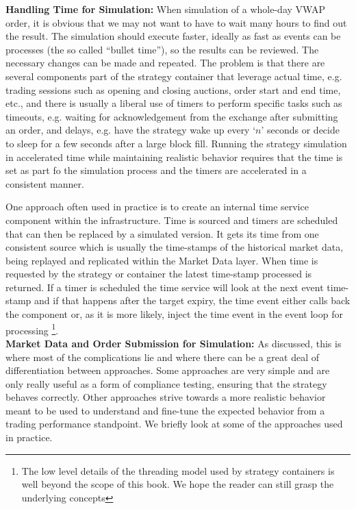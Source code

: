 \noindent\textbf{Handling Time for Simulation:} When simulation of a whole-day VWAP order, it is obvious that we may not want to have to wait many hours to find out the result. The simulation should execute faster, ideally as fast as events can be processes (the so called ``bullet time''), so the results can be reviewed. The necessary changes can be made and repeated. The problem is that there are several components part of the strategy container that leverage actual time, e.g. trading sessions such as opening and closing auctions, order start and end time, etc., and there is usually a liberal use of timers to perform specific tasks such as timeouts, e.g. waiting for acknowledgement from the exchange after submitting an order, and delays, e.g. have the strategy wake up every `$n$' seconds or decide to sleep for a few seconds after a large block fill. Running the strategy simulation in accelerated time while maintaining realistic behavior requires that the time is set as part fo the simulation process and the timers are accelerated in a consistent manner.


One approach often used in practice is to create an internal time service component within the infrastructure. Time is sourced and timers are scheduled that can then be replaced by a simulated version. It gets its time from one consistent source which is usually the time-stamps of the historical market data, being replayed and replicated within the Market Data layer. When time is requested by the strategy or container the latest time-stamp processed is returned. If a timer is scheduled the time service will look at the next event time-stamp and if that happens after the target expiry, the time event either calls back the component or, as it is more likely, inject the time event in the event loop for processing \footnote{The low level details of the threading model used by strategy containers is well beyond the scope of this book. We hope the reader can still grasp the underlying concepts}. \\


\noindent\textbf{Market Data and Order Submission for Simulation:} As discussed, this is where most of the complications lie and where there can be a great deal of differentiation between approaches. Some approaches are very simple and are only really useful as a form of compliance testing, ensuring that the strategy behaves correctly. Other approaches strive towards a more realistic behavior meant to be used to understand and fine-tune the expected behavior from a trading performance standpoint. We briefly look at some of the approaches used in practice. \\


